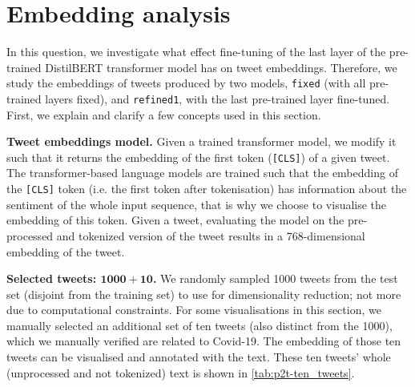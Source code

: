 \setcounter{section}{5}
\section{Embedding analysis}

In this question, we investigate what effect fine-tuning of the last layer of the pre-trained DistilBERT transformer model has on tweet embeddings. Therefore, we study the embeddings of tweets produced by two models, \texttt{fixed} (with all pre-trained layers fixed), and \texttt{refined1}, with the last pre-trained layer fine-tuned. First, we explain and clarify a few concepts used in this section.

\textbf{Tweet embeddings model.} Given a trained transformer model, we modify it such that it returns the embedding of the first token (\texttt{[CLS]}) of a given tweet. The transformer-based language models are trained such that the embedding of the \texttt{[CLS]} token (i.e. the first token after tokenisation) has information about the sentiment of the whole input sequence, that is why we choose to visualise the embedding of this token. Given a tweet, evaluating the model on the pre-processed and tokenized version of the tweet results in a 768-dimensional embedding of the tweet.

\textbf{Selected tweets: $\bm{1000 + 10}$.} We randomly sampled 1000 tweets from the test set (disjoint from the training set) to use for dimensionality reduction; not more due to computational constraints. For some visualisations in this section, we manually selected an additional set of ten tweets (also distinct from the 1000), which we manually verified are related to Covid-19. The embedding of those ten tweets can be visualised and annotated with the text. These ten tweets' whole (unprocessed and not tokenized) text is shown in \cref{tab:p2t-ten_tweets}.

